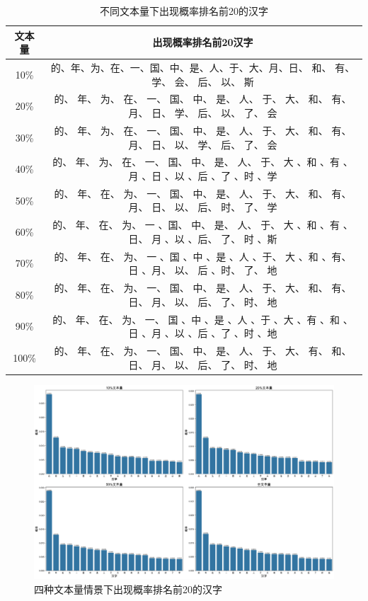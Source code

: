 \documentclass[11pt]{article}
\begin{document}
	\begin{table}[htbp]
		\centering
		\caption{不同文本量下出现概率排名前20的汉字}
		\label{tab:3.1}
		\begin{tabular}{cc} 
			\toprule
			文本量 & 出现概率排名前20汉字 \\ 
			\midrule
			10\% & 的、年、为、在、一、国、中、是、人、于、大、月、日、 和、 有、 学、 会、 后、 以、 斯 \\
			20\% & 的、 年、 为、 在、 一、 国、 中、 是、 人、 于、 大、 和、 有、 月、 日、 学、 后、 以、 了、 会 \\
			30\% & 的、 年、 为、 在、 一、 国、 中、 是、 人、 于、 大、 和、 有、 月、 日、 以、 学、 后、 了、 会 \\
			40\% & 的、 年、 为、 在、 一、 国、 中、 是、 人、 于、 大 、和 、有 、月 、日 、以 、后 、了 、时 、学 \\
			50\% & 的、 年、 在、 为、 一、 国、 中、 是、 人、 于、 大、 和、 有、 月、 日、 以、 后、 时、 了、 学 \\
			60\% & 的、 年、 在、 为、 一 、国、 中、 是、 人、 于、 大 、和 、有 、日、 月 、以 、后、 了、 时 、斯 \\
			70\% & 的、 年、 在、 为、 一 、国 、中 、是 、人 、于、 大 、和 、有、 日 、月、 以、 后 、时、 了、 地 \\
			80\% & 的、 年、 在、 为、 一、 国、 中、 是、 人、 于、 大、 和、 有、 日、 月、 以、 后、 了、 时、 地 \\
			90\% & 的、 年、 在、 为、 一、 国 、中 、是 、人 、于 、大 、有 、和 、日 、月 、以 、后 、了 、时 、地 \\
			100\% & 的、 年、 在、 为、 一、 国、 中、 是、 人、 于、 大、 有、 和、 日、 月、 以、 后、 了、 时、 地 \\
			\bottomrule
		\end{tabular}
	\end{table}
	
	\begin{figure}[htbp] 
		\centering
		\includegraphics[width=1\textwidth]{zh_top20_char_distribution_comparison.png}
		\caption{四种文本量情景下出现概率排名前20的汉字}
		\label{fig:3.1} 
	\end{figure}
	
\end{document}
